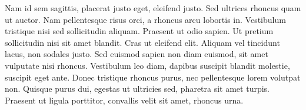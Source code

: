 Nam id sem sagittis, placerat justo eget, eleifend justo. Sed ultrices rhoncus quam ut auctor. Nam pellentesque risus orci, a rhoncus arcu lobortis in. Vestibulum tristique nisi sed sollicitudin aliquam. Praesent ut odio sapien. Ut pretium sollicitudin nisi sit amet blandit. Cras ut eleifend elit. Aliquam vel tincidunt lacus, non sodales justo. Sed euismod sapien non diam euismod, sit amet vulputate nisi rhoncus. Vestibulum leo diam, dapibus suscipit blandit molestie, suscipit eget ante. Donec tristique rhoncus purus, nec pellentesque lorem volutpat non. Quisque purus dui, egestas ut ultricies sed, pharetra sit amet turpis. Praesent ut ligula porttitor, convallis velit sit amet, rhoncus urna. 
